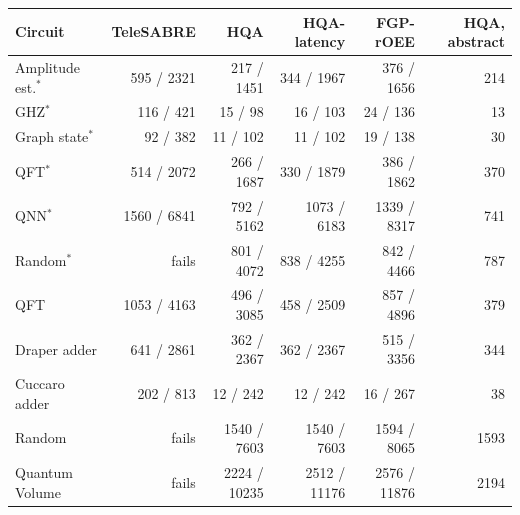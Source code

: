 \begin{tabular}{lrrrrr}
\toprule
Circuit & TeleSABRE & HQA & HQA-latency & FGP-rOEE & HQA, abstract \\
\midrule
Amplitude est.$^*$ & 595 / 2321 & 217 / 1451 & 344 / 1967 & 376 / 1656 & 214 \\
GHZ$^*$ & 116 / 421 & 15 / 98 & 16 / 103 & 24 / 136 & 13 \\
Graph state$^*$ & 92 / 382 & 11 / 102 & 11 / 102 & 19 / 138 & 30 \\
QFT$^*$ & 514 / 2072 & 266 / 1687 & 330 / 1879 & 386 / 1862 & 370 \\
QNN$^*$ & 1560 / 6841 & 792 / 5162 & 1073 / 6183 & 1339 / 8317 & 741 \\
Random$^*$ & fails & 801 / 4072 & 838 / 4255 & 842 / 4466 & 787 \\
\midrule
QFT & 1053 / 4163 & 496 / 3085 & 458 / 2509 & 857 / 4896 & 379 \\
Draper adder & 641 / 2861 & 362 / 2367 & 362 / 2367 & 515 / 3356 & 344 \\
Cuccaro adder & 202 / 813 & 12 / 242 & 12 / 242 & 16 / 267 & 38 \\
Random & fails & 1540 / 7603 & 1540 / 7603 & 1594 / 8065 & 1593 \\
Quantum Volume & fails & 2224 / 10235 & 2512 / 11176 & 2576 / 11876 & 2194 \\
\bottomrule
\end{tabular}
